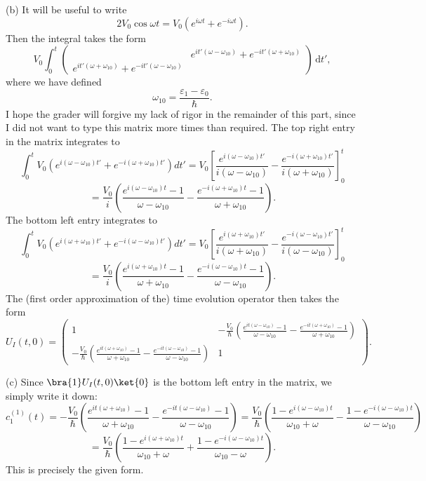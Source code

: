 \documentclass[11pt, letterpaper]{article}
\begin{document}
(b) It will be useful to write
\[
	2V_0 \cos \omega t=V_0 \left(e^{i\omega t} +e^{-i\omega t} \right)
.\]
Then the integral takes the form
\[
	 V_0 \int_{0}^{t} \begin{pmatrix}
	 & e^{it'(\omega -\omega _{10} )} +e^{-it'(\omega +\omega _{10} )}  \\
	e^{it'(\omega +\omega _{10} )} +e^{-it'(\omega -\omega _{10} )}  & 
	\end{pmatrix} \,\mathrm{d} t'
,\]
where we have defined
\[
	\omega _{10} =\frac{\varepsilon _1-\varepsilon _0}{\hbar} 
.\]
I hope the grader will forgive my lack of rigor in the remainder of this part, since I did not want to type this matrix more times than required. The top right entry in the matrix integrates to
$$ \int_0^t V_0 \left( e^{i(\omega - \omega_{10})t'} + e^{-i(\omega + \omega_{10})t'} \right) dt' = V_0 \left[ \frac{e^{i(\omega - \omega_{10})t'} }{i(\omega - \omega_{10})} - \frac{e^{-i(\omega + \omega_{10})t'} }{i(\omega + \omega_{10})} \right]_0^t $$ $$ = \frac{V_0}{i} \left( \frac{e^{i(\omega - \omega_{10})t} - 1}{\omega - \omega_{10}} - \frac{e^{-i(\omega + \omega_{10})t} - 1}{\omega + \omega_{10}} \right).$$
The bottom left entry integrates to
$$ \int_0^t V_0 \left( e^{i(\omega + \omega_{10})t'} + e^{-i(\omega - \omega_{10})t'} \right) dt' = V_0 \left[ \frac{e^{i(\omega + \omega_{10})t'} }{i(\omega + \omega_{10})} - \frac{e^{-i(\omega - \omega_{10})t'} }{i(\omega - \omega_{10})} \right]_0^t $$ $$ = \frac{V_0}{i} \left( \frac{e^{i(\omega + \omega_{10})t} - 1}{\omega + \omega_{10}} - \frac{e^{-i(\omega - \omega_{10})t} - 1}{\omega - \omega_{10}} \right).$$
The (first order approximation of the) time evolution operator then takes the form
\[
	U_I(t,0)=\begin{pmatrix}
		1 & \displaystyle{-\frac{V_0}{\hbar} \left( \frac{e^{it(\omega -\omega _{10} )} -1}{\omega -\omega _{10} } -\frac{e^{-it(\omega +\omega _{10} )} -1}{\omega +\omega _{10} }  \right) } \\
	 \displaystyle{-\frac{V_0}{\hbar} \left( \frac{e^{it(\omega +\omega _{10} )} -1}{\omega +\omega _{10} } -\frac{e^{-it(\omega -\omega _{10} )} -1}{\omega -\omega _{10} }  \right) } & 1
	\end{pmatrix}
.\]

(c) Since $\bra{1}U_I(t,0)\ket{0}$ is the bottom left entry in the matrix, we simply write it down:
\[
	c_1^{(1)} (t)=-\frac{V_0}{\hbar} \left( \frac{e^{it(\omega +\omega _{10} )} -1}{\omega +\omega _{10} } -\frac{e^{-it(\omega -\omega _{10} )} -1}{\omega -\omega _{10} }  \right)=\frac{V_0}{\hbar} \left( \frac{1-e^{i(\omega -\omega _{10} )t} }{\omega _{10} +\omega } -\frac{1-e^{-i(\omega -\omega _{10} )t} }{\omega -\omega _{10} }  \right) 	
\]
\[
	=\frac{V_0}{\hbar} \left( \frac{1-e^{i(\omega +\omega _{10} )t} }{\omega _{10} +\omega } +\frac{1-e^{-i(\omega -\omega _{10} )t} }{\omega _{10} -\omega }  \right) 
.\]
This is precisely the given form.
\end{document}
